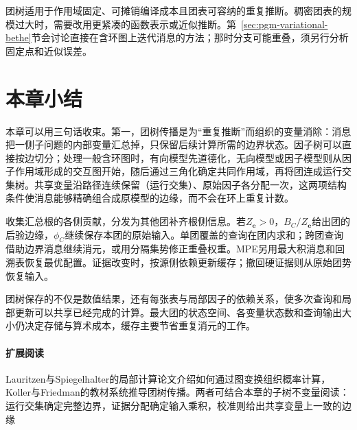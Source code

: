 团树适用于作用域固定、可摊销编译成本且团表可容纳的重复推断。稠密团表的规模过大时，需要改用更紧凑的函数表示或近似推断。第~\ref{sec:pgm-variational-bethe}节会讨论直接在含环图上迭代消息的方法；那时分支可能重叠，须另行分析固定点和近似误差。

\section{本章小结}
\label{sec:pgm-junction-tree-summary}

本章可以用三句话收束。第一，团树传播是为“重复推断”而组织的变量消除：消息把一侧子问题的内部变量汇总掉，只保留后续计算所需的边界状态。因子树可以直接按边切分；处理一般含环图时，有向模型先道德化，无向模型或因子模型则从因子作用域形成的交互图开始，随后通过三角化确定共同作用域，再将团连成运行交集树。共享变量沿路径连续保留（运行交集）、原始因子各分配一次，这两项结构条件使消息能够精确组合成原模型的边缘，而不会在环上重复计数。

收集汇总根的各侧贡献，分发为其他团补齐根侧信息。若$Z_{\bm e}>0$，$B_C/Z_{\bm e}$给出团的后验边缘，$\phi_C$继续保存本团的原始输入。单团覆盖的查询在团内求和；跨团查询借助边界消息继续消元，或用分隔集势修正重叠权重。MPE另用最大积消息和回溯表恢复最优配置。证据改变时，按源侧依赖更新缓存；撤回硬证据则从原始团势恢复输入。

团树保存的不仅是数值结果，还有每张表与局部因子的依赖关系，使多次查询和局部更新可以共享已经完成的计算。最大团的状态空间、各变量状态数和查询输出大小仍决定存储与算术成本，缓存主要节省重复消元的工作。

\paragraph{扩展阅读}
Lauritzen与Spiegelhalter的局部计算论文介绍如何通过图变换组织概率计算，Koller与Friedman的教材系统推导团树传播。两者可结合本章的子树不变量阅读：运行交集确定完整边界，证据分配确定输入乘积，校准则给出共享变量上一致的边缘
